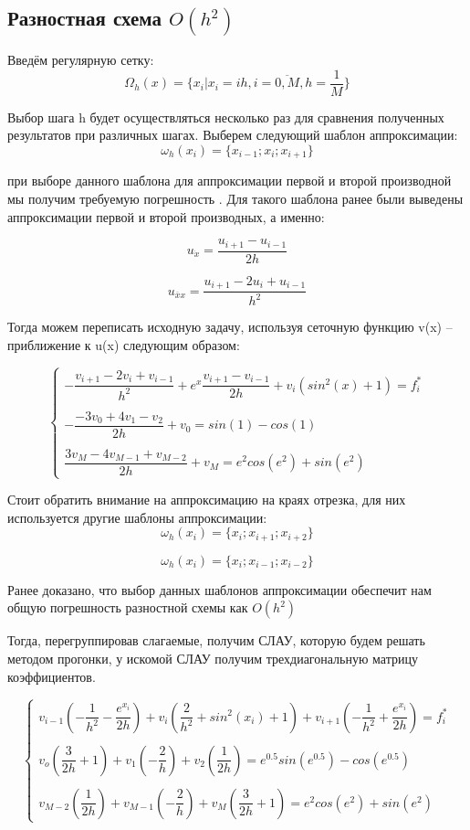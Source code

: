 \documentclass[12pt]{article}
\begin{document}
\subsection{Разностная схема $O(h^2)$}
Введём регулярную сетку:
$$
\Omega_h(x) = \{x_i | x_i = ih, i = \overline{0, M}, h = \dfrac{1}{M}\}
$$

Выбор шага h будет осуществляться несколько раз для сравнения полученных результатов при различных шагах.
Выберем следующий шаблон аппроксимации:
$$
\omega_h(x_i) = \{ x_{i-1}; x_i; x_{i + 1}\}
$$

при выборе данного шаблона для аппроксимации первой и второй производной  мы получим требуемую погрешность . Для такого шаблона ранее были выведены аппроксимации первой и второй производных, а именно:

$$
u_{\dot{x}} = \dfrac{u_{i + 1} - u_{i - 1}}{2h}
$$

$$
u_{\overline{x}x} = \dfrac{u_{i + 1} -2u_i+ u_{i - 1}}{h^2}
$$

Тогда можем переписать исходную задачу, используя сеточную функцию v(x) – приближение к u(x) следующим образом:

$$
\begin{cases}
-\dfrac{v_{i+1} - 2v_i + v_{i-1}}{h^2} + e^x\dfrac{v_{i+1} - v_{i-1}}{2h} + v_i(sin^2(x) + 1) = f_i^* \\
\\
- \dfrac{-3v_0 + 4v_1 - v_2}{2h} + v_0 = sin(1) - cos(1) \\
\\
\dfrac{3v_M - 4v_{M-1} + v_{M-2}}{2h} + v_M = e^2cos(e^2) + sin(e^2)
\end{cases}
$$

Стоит обратить внимание на аппроксимацию на краях отрезка, для них используется другие шаблоны аппроксимации:
$$
\omega_h(x_i) = \{ x_{i}; x_{i + 1}; x_{i + 2}\}
$$

$$
\omega_h(x_i) = \{ x_i; x_{i - 1}; x_{i - 2}\}
$$

Ранее доказано, что выбор данных шаблонов аппроксимации обеспечит нам общую погрешность разностной схемы как 
$O(h^2)$

Тогда, перегруппировав слагаемые, получим СЛАУ, которую будем решать методом прогонки, у искомой СЛАУ получим трехдиагональную матрицу коэффициентов.

$$
\begin{cases}
v_{i-1}(-\dfrac{1}{h^2} - \dfrac{e^{x_i}}{2h}) + v_i(\dfrac{2}{h^2} + sin^2(x_i) + 1) + v_{i + 1}(-\dfrac{1}{h^2} + \dfrac{e^{x_i}}{2h}) = f_i^*\\
\\
v_o(\dfrac{3}{2h}  +1) + v_1(-\dfrac{2}{h}) + v_2(\dfrac{1}{2h}) = e^{0.5}sin(e^{0.5}) - cos(e^{0.5})\\
\\
v_{M-2}(\dfrac{1}{2h}) + v_{M-1}(-\dfrac{2}{h})  +v_M(\dfrac{3}{2h} + 1) = e^2cos(e^2) + sin(e^2)
\end{cases}
$$
\end{document}
